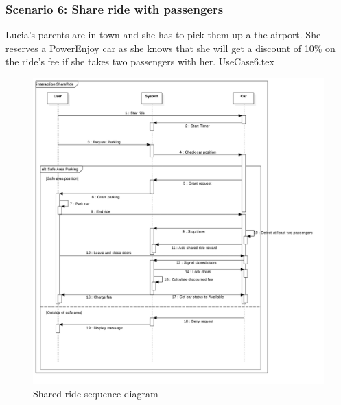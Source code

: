 \documentclass[12pt]{article}
\begin{document}
		\subsubsection{Scenario 6: Share ride with passengers}
		Lucia's parents are in town and she has to pick them up a the airport. She reserves
		a PowerEnjoy car as she knows that she will get a discount of 10\% on the ride's fee
		if she takes two passengers with her.
		\FloatBarrier
		{UseCase6.tex}
		\newpage
		\begin{figure}[htbp]
		 \caption{Shared ride sequence diagram}
		\includegraphics[scale=0.49]{Images/SequenceDiagram/ShareRide.png}
 	 	\end{figure}
 	 	\clearpage
		
\end{document}

